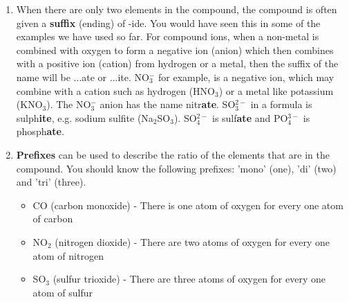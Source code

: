 \begin{enumerate}
\item{When there are only two elements in the compound, the compound is often given a \textbf{suffix} (ending) of -ide. You would have seen this in some of the examples we have used so far. For compound ions, when a non-metal is combined with oxygen to form a negative ion (anion) which then combines with a positive ion (cation) from hydrogen or a metal, then the suffix of the name will be ...ate or ...ite. NO$_{3}^{-}$ for example, is a negative ion, which may combine with a cation such as hydrogen (HNO$_{3}$) or a metal like potassium (KNO$_{3}$). The NO$_{3}^{-}$ anion has the name nitr\textbf{ate}. SO$_{3}^{2-}$ in a formula is sulph\textbf{ite}, e.g. sodium sulfite (Na$_{2}$SO$_{3}$). SO$_{4}^{2-}$ is sulf\textbf{ate} and PO$_{4}^{3-}$ is phosph\textbf{ate}. 
}

\item{\textbf{Prefixes} can be used to describe the ratio of the elements that are in the compound. You should know the following prefixes: 'mono' (one), 'di' (two) and 'tri' (three).}

	\begin{itemize}
	\item{CO (carbon monoxide) - There is one atom of oxygen for every one atom of carbon}
	\item{NO$_{2}$ (nitrogen dioxide) - There are two atoms of oxygen for every one atom of nitrogen}
	\item{SO$_{3}$ (sulfur trioxide) - There are three atoms of oxygen for every one atom of sulfur}
	\end{itemize}

\end{enumerate}


